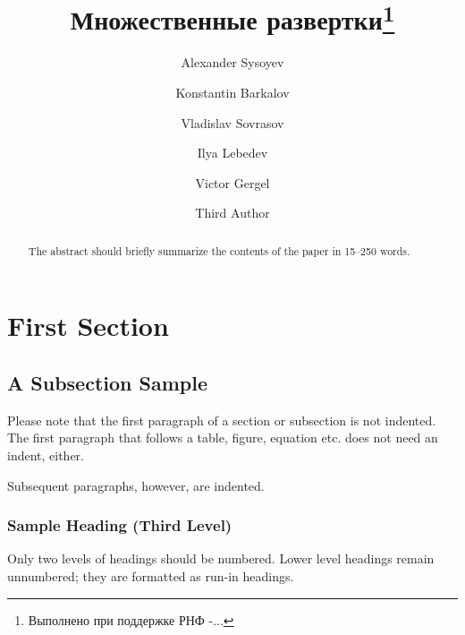 \documentclass[runningheads]{llncs}
\begin{document}
%
\title{Множественные развертки\thanks{Выполнено при поддержке РНФ -...}}
%
%
\author{Alexander Sysoyev \and
Konstantin Barkalov \and
Vladislav Sovrasov \and
Ilya Lebedev \and
Victor Gergel \and
Third Author}
%
%
%
\maketitle              %
%
\begin{abstract}
The abstract should briefly summarize the contents of the paper in
15--250 words.

\end{abstract}
%
%
%
\section{First Section}
\subsection{A Subsection Sample}
Please note that the first paragraph of a section or subsection is
not indented. The first paragraph that follows a table, figure,
equation etc. does not need an indent, either.

Subsequent paragraphs, however, are indented.

\subsubsection{Sample Heading (Third Level)} Only two levels of
headings should be numbered. Lower level headings remain unnumbered;
they are formatted as run-in headings.
\end{document}
